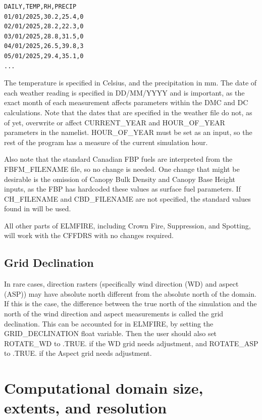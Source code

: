 \begin{verbatim}
DAILY,TEMP,RH,PRECIP
01/01/2025,30.2,25.4,0
02/01/2025,28.2,22.3,0
03/01/2025,28.8,31.5,0
04/01/2025,26.5,39.8,3
05/01/2025,29.4,35.1,0
...
\end{verbatim}

The temperature is specified in Celsius, and the precipitation in mm. The date of each weather reading is specified in DD/MM/YYYY and is important, as the exact month of each measurement affects parameters within the DMC and DC calculations. Note that the dates that are specified in the weather file do not, as of yet, overwrite or affect CURRENT\_YEAR and HOUR\_OF\_YEAR parameters in the  namelist. HOUR\_OF\_YEAR must be set as an input, so the rest of the program has a measure of the current simulation hour. 

Also note that the standard Canadian FBP fuels are interpreted from the FBFM\_FILENAME file, so no change is needed. One change that might be desirable is the omission of Canopy Bulk Density and Canopy Base Height inputs, as the FBP has hardcoded these values as surface fuel parameters. If CH\_FILENAME and CBD\_FILENAME are not specified, the standard values found in \cite{tymstraDevelopmentStructurePrometheus2010} will be used. 

All other parts of ELMFIRE, including Crown Fire, Suppression, and Spotting, will work with the CFFDRS with no changes required. 

\subsection{Grid Declination}
\label{grid_declination}

In rare cases, direction rasters (specifically wind direction (WD) and aspect (ASP)) may have absolute north different from the absolute north of the domain. If this is the case, the difference between the true north of the simulation and the north of the wind direction and aspect measurements is called the grid declination. This can be accounted for in ELMFIRE, by setting the GRID\_DECLINATION float variable. Then the user should also set ROTATE\_WD to .TRUE. if the WD grid needs adjustment, and ROTATE\_ASP to .TRUE. if the Aspect grid needs adjustment.

\section{Computational domain size, extents, and resolution}
\label{computational_domain_size}

